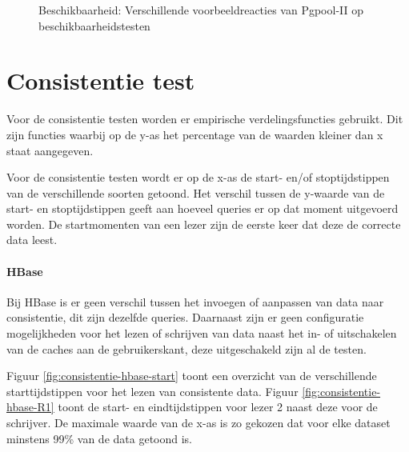 \begin{figure}[ht!]
	\caption{Beschikbaarheid: Verschillende voorbeeldreacties van Pgpool-II op beschikbaarheidstesten }
	\label{fig:beschikbaar-pgpool}
\end{figure}

\section{Consistentie test}
Voor de consistentie testen worden er empirische verdelingsfuncties gebruikt. Dit zijn functies waarbij op de y-as het percentage van de waarden kleiner dan x staat aangegeven.

Voor de consistentie testen wordt er op de x-as de start- en/of stoptijdstippen van de verschillende soorten getoond. Het verschil tussen de y-waarde van de start- en stoptijdstippen geeft aan hoeveel queries er op dat moment uitgevoerd worden. De startmomenten van een lezer zijn de eerste keer dat deze de correcte data leest. 

\paragraph{HBase}
Bij HBase is er geen verschil tussen het invoegen of aanpassen van data naar consistentie, dit zijn dezelfde queries. Daarnaast zijn er geen configuratie mogelijkheden voor het lezen of schrijven van data naast het in- of uitschakelen van de caches aan de gebruikerskant, deze uitgeschakeld zijn al de testen. 

Figuur \ref{fig:consistentie-hbase-start} toont een overzicht van de verschillende starttijdstippen voor het lezen van consistente data. Figuur \ref{fig:consistentie-hbase-R1} toont de start- en eindtijdstippen voor lezer 2 naast deze voor de schrijver. De maximale waarde van de x-as is zo gekozen dat voor elke dataset minstens 99\% van de data getoond is. 

